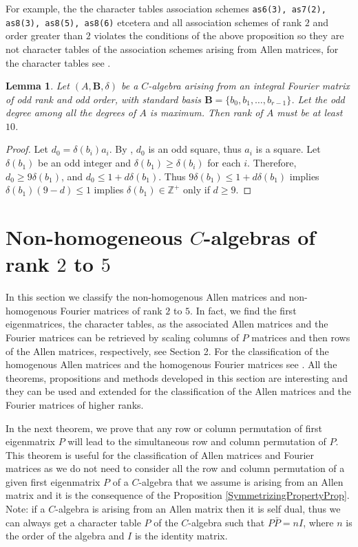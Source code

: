 \documentclass[12pt]{amsart}
\newtheorem{lemma}[thm]{Lemma}
\begin{document}
For example, the the character tables association schemes {\tt as6(3),  as7(2), as8(3), as8(5), as8(6)} etcetera and all association schemes of rank $2$ and order greater than $2$ violates the conditions of the above proposition so they are not character tables of the association schemes  arising from Allen matrices, for the character tables see \cite{HM}.

\begin{lemma}Let $(A,{{\mathbf B}}, \delta)$ be a $C$-algebra arising from an integral Fourier matrix of odd rank and odd order, with standard  basis ${{\mathbf B}}=\{b_0,b_1,\hdots, b_{r-1}\}$. Let the odd degree among all the degrees of $A$ is maximum. Then rank of $A$ must be at least $10$.
\end{lemma}

\begin{proof}
Let $d_0=\delta(b_i)a_i$. By \cite[Lemma 3.7]{MC1}, $d_0$ is an odd square, thus $a_i$ is a square.
Let $\delta(b_1)$ be an odd integer and $\delta(b_1)\geq \delta(b_i)$ for each $i$. Therefore, $d_0\geq 9\delta(b_1)$, and $ d_0\leq  1+d\delta(b_1)$. Thus $ 9\delta(b_1)\leq 1+d\delta(b_1)$ implies  $\delta(b_1)(9-d)\leq 1$ implies $\delta(b_1) \in {{\mathbb Z}}^+$ only if $d\geq9$.
\end{proof}

\section{Non-homogeneous $C$-algebras of rank $2$ to $5$}

\medskip

In this section we classify the non-homogenous Allen matrices and non-homogenous Fourier matrices of rank $2$ to $5$. In fact, we find the first eigenmatrices, the character tables, as the associated Allen matrices and the Fourier matrices can be retrieved by scaling columns of $P$ matrices and then rows of the Allen matrices, respectively, see Section 2. For the classification of the homogenous Allen matrices and the homogenous Fourier matrices see \cite{G1}. All the theorems, propositions and  methods developed in this section are interesting and they can be used and extended for the classification of the Allen matrices and the Fourier matrices of higher ranks.

\smallskip

In the next theorem, we prove that any row or column permutation of first eigenmatrix $P$ will lead to the simultaneous row and column permutation of $P$. This theorem is useful for the classification of Allen matrices and Fourier matrices as we do not need to consider all the row and column permutation of a given first eigenmatrix $P$ of a $C$-algebra that we assume is arising from an Allen matrix and it is the consequence of the Proposition \ref{SymmetrizingPropertyProp}. Note: if a $C$-algebra is arising from an Allen matrix then it is self dual, thus we can always get a character table $P$ of the $C$-algebra such that $P\bar P=nI$, where $n$ is the order of the algebra and $I$ is the identity matrix.
\end{document}
